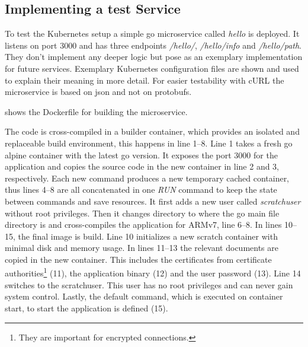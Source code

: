 \subsection{Implementing a test Service} \label{sec:testService}
To test the Kubernetes setup a simple go microservice called \textit{hello} is deployed. It listens on port 3000 and has three endpoints \textit{/hello/}, \textit{/hello/info} and \textit{/hello/path}. They don't implement any deeper logic but pose as an exemplary implementation for future services. Exemplary Kubernetes configuration files are shown and used to explain their meaning in more detail. For easier testability with cURL the microservice is based on json and not on protobufs.

 shows the Dockerfile for building the microservice.

The code is cross-compiled in a builder container, which provides an isolated and replaceable build environment, this happens in line 1--8. Line 1 takes a fresh go alpine container with the latest go version. It exposes the port 3000 for the application and copies the source code in the new container in line 2 and 3, respectively. Each new command produces a new temporary cached container, thus lines 4--8 are all concatenated in one \textit{RUN} command to keep the state between commands and save resources. It first adds a new user called \textit{scratchuser} without root privileges. Then it changes directory to where the go main file directory is and cross-compiles the application for ARMv7, line 6--8. In lines 10--15, the final image is build. Line 10 initializes a new scratch container with minimal disk and memory usage. In lines 11--13 the relevant documents are copied in the new container. This includes the certificates from certificate authorities\footnote{They are important for encrypted connections.} (11), the application binary (12) and the user password (13). Line 14 switches to the scratchuser. This user has no root privileges and can never gain system control. Lastly, the default command, which is executed on container start, to start the application is defined (15).

